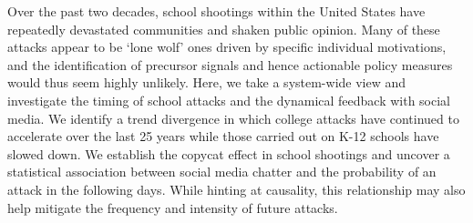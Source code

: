 Over the past two decades, school shootings within the United States 
have repeatedly devastated communities and shaken public opinion.
Many of these attacks appear to be `lone wolf' ones driven by
specific individual motivations,
and the identification of precursor signals and hence
actionable policy measures would thus seem highly unlikely.
Here, we take a system-wide view and investigate 
the timing of school attacks and the dynamical
feedback with social media.
We identify a trend divergence in which college attacks have continued
to accelerate over the last 25 years 
while those carried out on K-12 schools have slowed down.
We establish the copycat effect in school shootings and uncover a
statistical association between social media chatter
and the probability of an attack in the following days. 
While hinting at causality, this relationship may also help mitigate the
frequency and intensity of future attacks.
